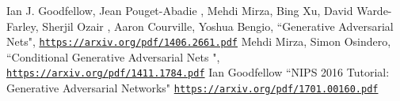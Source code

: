\documentclass[conference]{IEEEtran}
\begin{document}
\begin{thebibliography}{00}
Ian J. Goodfellow, Jean Pouget-Abadie
, Mehdi Mirza, Bing Xu, David Warde-Farley,
Sherjil Ozair
, Aaron Courville, Yoshua Bengio, ``Generative Adversarial Nets", \href{https://arxiv.org/pdf/1406.2661.pdf}{\texttt{https://arxiv.org/pdf/1406.2661.pdf}}
Mehdi Mirza, Simon Osindero, ``Conditional Generative Adversarial Nets
", \href{https://arxiv.org/pdf/1411.1784.pdf}{\texttt{https://arxiv.org/pdf/1411.1784.pdf}}
Ian Goodfellow ``NIPS 2016 Tutorial:
Generative Adversarial Networks" \href{https://arxiv.org/pdf/1701.00160.pdf}{\texttt{https://arxiv.org/pdf/1701.00160.pdf}}
\end{thebibliography}
\end{document}
